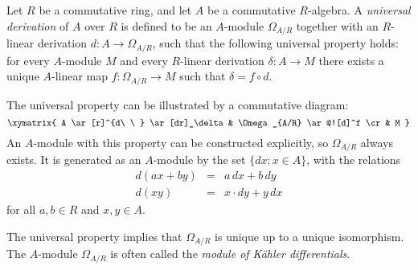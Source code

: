 \documentclass[12pt]{article}
\begin{document}
Let $R$ be a commutative ring, and let $A$ be a commutative $R$-algebra.  A
\emph{universal derivation} of $A$ over $R$ is defined to be an
$A$-module $\Omega_{A/R}$ together with an $R$-linear derivation $d\colon                              
A\to\Omega_{A/R}$, such that the following universal property holds:
for every $A$-module $M$ and every $R$-linear derivation
$\delta\colon A\to M$ there exists a unique $A$-linear map $f\colon\Omega_{A/R}\to M$ such that $\delta=f\circ d$.

The universal property can be illustrated by a commutative diagram:
$$
\xymatrix{
A \ar[r]^{d\ \ } \ar[dr]_\delta & \Omega_{A/R} \ar@![d]^f \cr
& M
}
$$
An $A$-module with this property can be constructed explicitly, so
$\Omega_{A/R}$ always exists.  It is generated as an $A$-module by
the set $\{dx:x\in A\}$, with the relations
\begin{eqnarray*}
d(ax+by)&=&a\,dx+b\,dy \\
d(xy)&=&x\cdot dy+y\,dx
\end{eqnarray*}
for all $a,b\in R$ and $x,y\in A$.

The universal property implies that $\Omega_{A/R}$ is unique up to
a unique isomorphism.  The $A$-module $\Omega_{A/R}$ is often called
the \emph{module of K\"ahler differentials}.
\end{document}
